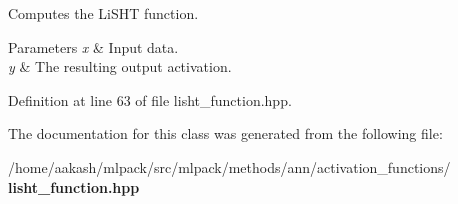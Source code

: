 Computes the Li\+S\+HT function. 


\begin{DoxyParams}{Parameters}
{\em x} & Input data. \\
\hline
{\em y} & The resulting output activation. \\
\hline
\end{DoxyParams}


Definition at line 63 of file lisht\+\_\+function.\+hpp.



The documentation for this class was generated from the following file\+:\begin{DoxyCompactItemize}
\item 
/home/aakash/mlpack/src/mlpack/methods/ann/activation\+\_\+functions/\textbf{ lisht\+\_\+function.\+hpp}\end{DoxyCompactItemize}
